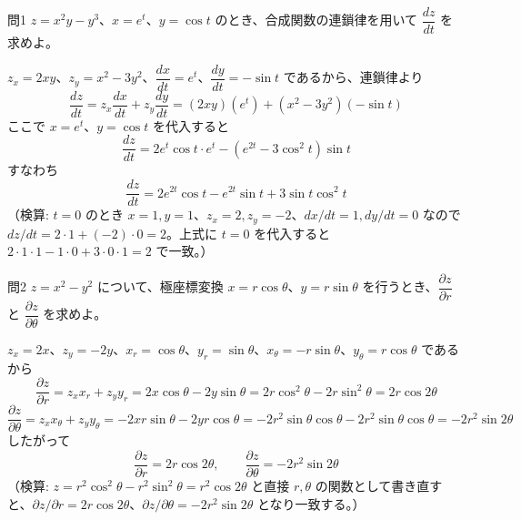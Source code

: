 \documentclass[a4paper,11pt]{article}
\begin{document}
\clearpage
\begin{mondaiboxS}{問1}
$z = x^{2}y - y^{3}$、$x = e^{t}$、$y = \cos t$ のとき、合成関数の連鎖律を用いて $\dfrac{dz}{dt}$ を求めよ。
\end{mondaiboxS}
\kaitou
$z_{x} = 2xy$、$z_{y} = x^{2} - 3y^{2}$、$\dfrac{dx}{dt} = e^{t}$、$\dfrac{dy}{dt} = -\sin t$ であるから、連鎖律より
\[
\frac{dz}{dt} = z_{x}\frac{dx}{dt} + z_{y}\frac{dy}{dt}
= (2xy)(e^{t}) + (x^{2}-3y^{2})(-\sin t)
\]
ここで $x = e^{t}$、$y=\cos t$ を代入すると
\[
\frac{dz}{dt} = 2e^{t}\cos t \cdot e^{t} - (e^{2t} - 3\cos^{2}t)\sin t
\]
すなわち
\[
\boxed{\; \frac{dz}{dt} = 2e^{2t}\cos t - e^{2t}\sin t + 3\sin t\cos^{2}t \;}
\]
（検算: $t=0$ のとき $x=1,y=1$、$z_x=2,z_y=-2$、$dx/dt=1,dy/dt=0$ なので $dz/dt=2\cdot1+(-2)\cdot0=2$。上式に $t=0$ を代入すると $2\cdot1\cdot1 - 1\cdot0 + 3\cdot0\cdot1 = 2$ で一致。）

\clearpage
\begin{mondaiboxS}{問2}
$z = x^{2} - y^{2}$ について、極座標変換 $x = r\cos\theta$、$y = r\sin\theta$ を行うとき、$\dfrac{\partial z}{\partial r}$ と $\dfrac{\partial z}{\partial \theta}$ を求めよ。
\end{mondaiboxS}
\kaitou
$z_{x} = 2x$、$z_{y} = -2y$、$x_{r} = \cos\theta$、$y_{r}=\sin\theta$、$x_{\theta} = -r\sin\theta$、$y_{\theta} = r\cos\theta$ であるから
\[
\frac{\partial z}{\partial r} = z_{x}x_{r} + z_{y}y_{r} = 2x\cos\theta - 2y\sin\theta = 2r\cos^{2}\theta - 2r\sin^{2}\theta = 2r\cos 2\theta
\]
\[
\frac{\partial z}{\partial \theta} = z_{x}x_{\theta} + z_{y}y_{\theta} = -2xr\sin\theta - 2yr\cos\theta = -2r^{2}\sin\theta\cos\theta - 2r^{2}\sin\theta\cos\theta = -2r^{2}\sin 2\theta
\]
したがって
\[
\boxed{\; \frac{\partial z}{\partial r} = 2r\cos 2\theta, \qquad \frac{\partial z}{\partial \theta} = -2r^{2}\sin 2\theta \;}
\]
（検算: $z = r^{2}\cos^{2}\theta - r^{2}\sin^{2}\theta = r^{2}\cos 2\theta$ と直接 $r,\theta$ の関数として書き直すと、$\partial z/\partial r = 2r\cos2\theta$、$\partial z/\partial \theta = -2r^{2}\sin2\theta$ となり一致する。）
\end{document}
